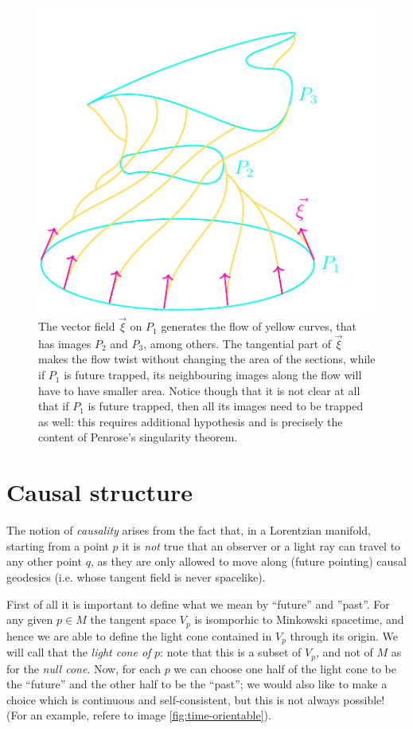 	\begin{figure}
		\caption[]{The vector field \(\vec{\xi}\) on \(P_1\) generates the flow of yellow curves, that has images \(P_2\) and \(P_3\), among others. The tangential part of \(\vec{\xi}\) makes the flow twist without changing the area of the sections, while if \(P_1\) is future trapped, its neighbouring images along the flow will have to have smaller area. Notice though that it is not clear at all that if \(P_1\) is future trapped, then all its images need to be trapped as well: this requires additional hypothesis and is precisely the content of Penrose's singularity theorem.}
		\label{fig:area-and-curvature}
		\centering
		\includegraphics[scale=1]{Immagini/area-and-curvature/area-and-curvature.pdf}
	\end{figure}


\section{Causal structure}

The notion of \emph{causality} arises from the fact that, in a Lorentzian manifold, starting from a  point \(p\) it is \emph{not} true that an observer or a light ray can travel to any other point \(q\), as they are only allowed to move along (future pointing) causal geodesics (i.e. whose tangent field is never spacelike).

First of all it is important to define what we mean by ``future'' and ''past''. For any given \(p\in M\) the tangent space \(V_p\) is isomporhic to Minkowski spacetime, and hence we are able to define the light cone contained in \(V_p\) through its origin. We will call that the \emph{light cone of} \(p\): note that this is a subset of \(V_p\), and not of \(M\) as for the \emph{null cone}.
Now, for each \(p\) we can choose one half of the light cone to be the ``future'' and the other half to be the ``past''; we would also like to make a choice which is continuous and self-consistent, but this is not always possible! (For an example, refere to image \ref{fig:time-orientable}).

